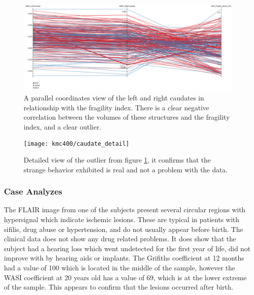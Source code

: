 \begin{figure}
	\centering
		\includegraphics[width=\textwidth]{figures/kmc400/caudate_parallel}
	\caption{A parallel coordinates view of the left and right caudates in relationship with the fragility index. There is a clear negative correlation between the volumes of these structures and the fragility index, and a clear outlier.}
	\label{fig_caudate_parallel}
\end{figure}


\begin{figure}
	\centering
		\texttt{[image: kmc400/caudate\_detail]}
	\caption{Detailed view of the outlier from figure \ref{fig_caudate_parallel}, it confirms that the strange behavior exhibited is real and not a problem with the data.}
	\label{fig_asymetric_caudate_detail}
\end{figure}

\subsubsection{Case Analyzes}
 
The FLAIR image from one of the subjects present several circular regions with hypersignal which indicate ischemic lesions. These are typical in patients with sifilis, drug abuse or hypertension, and do not usually appear before birth. The clinical data does not show any drug related problems. It does show that the subject had a hearing loss which went undetected for the first year of life, did not improve with by hearing aids or implants. The Grifiths coefficient at 12 months had a value of 100 which is located in the middle of the sample, however the WASI coefficient at 20 years old has a value of 69, which is at the lower extreme of the sample. This appears to confirm that the lesions occurred after birth.

